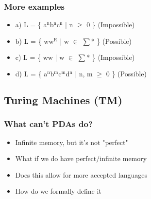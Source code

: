 \documentclass[11pt]{article}
\begin{document}
\subsubsection{More examples}
\label{sec:orga644066}
\begin{itemize}
\item a) L = \{ a\(^{\text{n}}\)b\(^{\text{n}}\)c\(^{\text{n}}\) | n \(\ge\) 0 \} (Impossible)
\item b) L = \{ ww\(^{\text{R}}\) | w \(\in\) \(\sum\)* \} (Possible)
\item c) L = \{ ww | w \(\in\) \(\sum\)* \} (Impossible)
\item d) L = \{ a\(^{\text{n}}\)b\(^{\text{m}}\)c\(^{\text{m}}\)d\(^{\text{n}}\) | n, m \(\ge\) 0 \} (Possible)
\end{itemize}
\subsection{Turing Machines (TM)}
\label{sec:orgbfdddc5}
\subsubsection{What can't PDAs do?}
\label{sec:orgfda6436}
\begin{itemize}
\item Infinite memory, but it's not "perfect"
\item What if we do have perfect/infinite memory
\item Does this allow for more accepted languages
\item How do we formally define it
\end{itemize}
\end{document}
